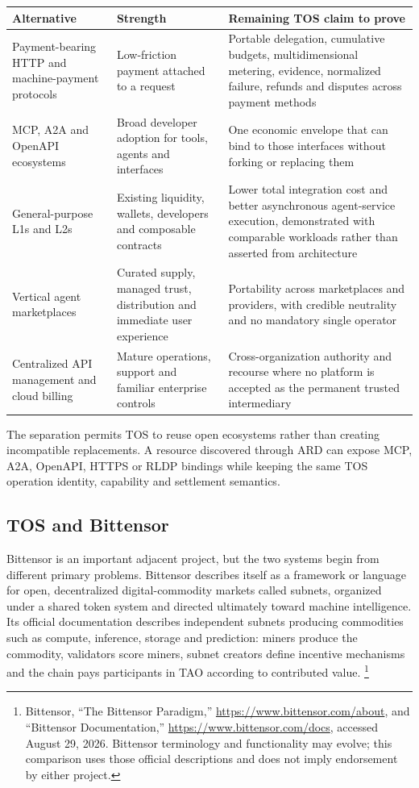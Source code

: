 \documentclass[11pt,oneside]{article}
\begin{document}
\begin{longtable}{L{0.22\textwidth}L{0.29\textwidth}L{0.38\textwidth}}
\toprule
Alternative & Strength & Remaining TOS claim to prove \\
\midrule
\endhead
Payment-bearing HTTP and machine-payment protocols &
Low-friction payment attached to a request &
Portable delegation, cumulative budgets, multidimensional metering, evidence, normalized
failure, refunds and disputes across payment methods \\
MCP, A2A and OpenAPI ecosystems &
Broad developer adoption for tools, agents and interfaces &
One economic envelope that can bind to those interfaces without forking or replacing them \\
General-purpose L1s and L2s &
Existing liquidity, wallets, developers and composable contracts &
Lower total integration cost and better asynchronous agent-service execution, demonstrated
with comparable workloads rather than asserted from architecture \\
Vertical agent marketplaces &
Curated supply, managed trust, distribution and immediate user experience &
Portability across marketplaces and providers, with credible neutrality and no mandatory
single operator \\
Centralized API management and cloud billing &
Mature operations, support and familiar enterprise controls &
Cross-organization authority and recourse where no platform is accepted as the permanent
trusted intermediary \\
\bottomrule
\end{longtable}

The separation permits TOS to reuse open ecosystems rather than creating incompatible
replacements. A resource discovered through ARD can expose MCP, A2A, OpenAPI, HTTPS or RLDP
bindings while keeping the same TOS operation identity, capability and settlement semantics.

\subsection{TOS and Bittensor}

Bittensor is an important adjacent project, but the two systems begin from different primary
problems. Bittensor describes itself as a framework or language for open, decentralized
digital-commodity markets called subnets, organized under a shared token system and directed
ultimately toward machine intelligence. Its official documentation describes independent
subnets producing commodities such as compute, inference, storage and prediction: miners
produce the commodity, validators score miners, subnet creators define incentive mechanisms
and the chain pays participants in TAO according to contributed value.
\footnote{Bittensor, ``The Bittensor Paradigm,''
\url{https://www.bittensor.com/about}, and ``Bittensor Documentation,''
\url{https://www.bittensor.com/docs}, accessed August 29, 2026. Bittensor terminology and
functionality may evolve; this comparison uses those official descriptions and does not imply
endorsement by either project.}
\end{document}
